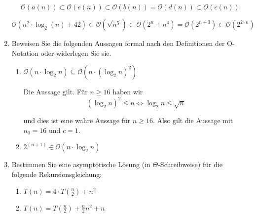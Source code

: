 \documentclass{bschlangaul-aufgabe}
\begin{document}
\begin{enumerate}
\begin{liAntwort}
\begin{displaymath}
\mathcal{O}(a (n)) \subset \mathcal{O}(e(n)) \subset \mathcal{O}(b(n)) = \mathcal{O}(d(n)) \subset \mathcal{O}(c(n))
\end{displaymath}

\begin{displaymath}
\mathcal{O}(n^2 \cdot \log_2(n) + 42) \subset
\mathcal{O}(\sqrt{n^5}) \subset
\mathcal{O}(2^n + n^4) =
\mathcal{O}(2^{n+3}) \subset
\mathcal{O}(2^{2 \cdot n})
\end{displaymath}
\end{liAntwort}


\item Beweisen Sie die folgenden Aussagen formal nach den Definitionen
der O-Notation oder widerlegen Sie sie.

\begin{enumerate}


\item $\mathcal{O}(n \cdot \log_2 n) \subseteq \mathcal{O}(n \cdot (\log_2 n)^2)$

\begin{liAntwort}
Die Aussage gilt.
Für $n \geq 16$ haben wir
\begin{displaymath}
(\log_2 n)^2 \leq n \Leftrightarrow \log_2 n  \leq \sqrt n
\end{displaymath}

und dies ist eine wahre Aussage für $n \geq 16$. Also gilt die Aussage mit $n_0 = 16$ und $c = 1$.
\end{liAntwort}


\item $2^{(n+1)} \in \mathcal{O}(n \cdot \log_2 n)$
\end{enumerate}


\item Bestimmen Sie eine asymptotische Lösung (in $\Theta$-Schreibweise)
für die folgende Rekursionsgleichung:

\begin{enumerate}


\item $T(n) = 4 \cdot T(\frac{n}{2}) + n^2$


\item $T(n) =  T(\frac{n}{2}) +\frac{n}{2} n^2 + n$
\end{enumerate}

\end{enumerate}
\end{document}
